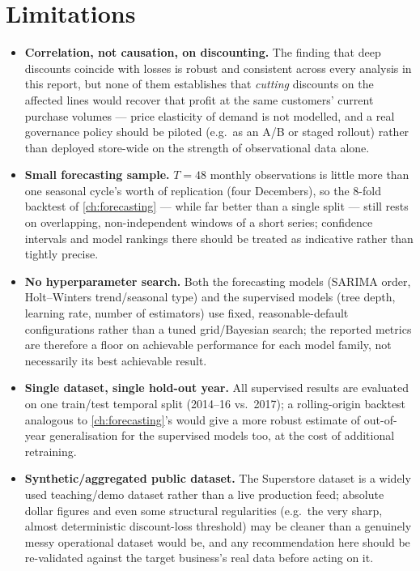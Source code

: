 \section{Limitations}
\begin{itemize}
  \item \textbf{Correlation, not causation, on discounting.} The finding
        that deep discounts coincide with losses is robust and
        consistent across every analysis in this report, but none of
        them establishes that \emph{cutting} discounts on the affected
        lines would recover that profit at the same customers' current
        purchase volumes — price elasticity of demand is not modelled,
        and a real governance policy should be piloted (e.g.\ as an
        A/B or staged rollout) rather than deployed store-wide on the
        strength of observational data alone.
  \item \textbf{Small forecasting sample.} $T=48$ monthly observations
        is little more than one seasonal cycle's worth of replication
        (four Decembers), so the 8-fold backtest of \cref{ch:forecasting}
        — while far better than a single split — still rests on
        overlapping, non-independent windows of a short series;
        confidence intervals and model rankings there should be treated
        as indicative rather than tightly precise.
  \item \textbf{No hyperparameter search.} Both the forecasting models
        (SARIMA order, Holt--Winters trend/seasonal type) and the
        supervised models (tree depth, learning rate, number of
        estimators) use fixed, reasonable-default configurations rather
        than a tuned grid/Bayesian search; the reported metrics are
        therefore a floor on achievable performance for each model
        family, not necessarily its best achievable result.
  \item \textbf{Single dataset, single hold-out year.} All supervised
        results are evaluated on one train/test temporal split
        (2014--16 vs.\ 2017); a rolling-origin backtest analogous to
        \cref{ch:forecasting}'s would give a more robust estimate of
        out-of-year generalisation for the supervised models too, at
        the cost of additional retraining.
  \item \textbf{Synthetic/aggregated public dataset.} The Superstore
        dataset is a widely used teaching/demo dataset rather than a
        live production feed; absolute dollar figures and even some
        structural regularities (e.g.\ the very sharp, almost
        deterministic discount-loss threshold) may be cleaner than a
        genuinely messy operational dataset would be, and any
        recommendation here should be re-validated against the target
        business's real data before acting on it.
\end{itemize}

